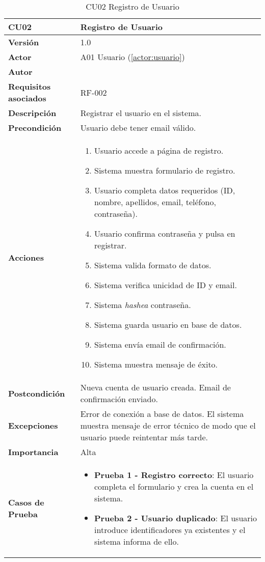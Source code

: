 \begin{table}[H]
	\centering
	\begin{tabularx}{\linewidth}{ p{} p{} }
		\toprule
		\textbf{CU02}    & \textbf{Registro de Usuario} \\
		\toprule
		\textbf{Versión}              & 1.0    \\
		\textbf{Actor}                & A01 Usuario (\ref{actor:usuario}) \\
		\textbf{Autor}                & \nombre \\
		\textbf{Requisitos asociados} & RF-002 \\
		\textbf{Descripción}          & Registrar el usuario en el sistema. \\
		\textbf{Precondición}         & Usuario debe tener email válido. \\
		\textbf{Acciones}             &
		\begin{enumerate}
			\def\labelenumi{\arabic{enumi}.}
			\tightlist
			\item Usuario accede a página de registro.
            \item Sistema muestra formulario de registro.
            \item Usuario completa datos requeridos (ID, nombre, apellidos, email, teléfono, contraseña).
            \item Usuario confirma contraseña y pulsa en registrar.
            \item Sistema valida formato de datos.
            \item Sistema verifica unicidad de ID y email.
            \item Sistema \emph{hashea} contraseña.
            \item Sistema guarda usuario en base de datos.
            \item Sistema envía email de confirmación.
            \item Sistema muestra mensaje de éxito.
		\end{enumerate}\\
		\textbf{Postcondición}        & Nueva cuenta de usuario creada. Email de confirmación enviado.\\
		\textbf{Excepciones}          & Error de conexión a base de datos. El sistema muestra mensaje de error técnico de modo que el usuario puede reintentar más tarde.\\
		\textbf{Importancia}          & Alta \\
		\textbf{Casos de Prueba}      &
		\begin{itemize}
			\item \textbf{Prueba 1 - Registro correcto}: El usuario completa el formulario y crea la cuenta en el sistema.
			\item \textbf{Prueba 2 - Usuario duplicado}: El usuario introduce identificadores ya existentes y el sistema informa de ello.
		\end{itemize} \\
		\bottomrule
	\end{tabularx}
	\caption{CU02 Registro de Usuario}
	\label{cu:registro-usuario}
\end{table}

